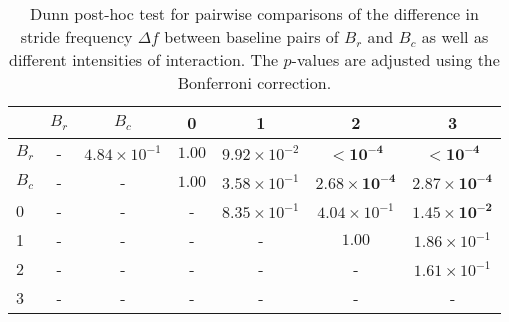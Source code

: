 \begin{table}
\centering
\caption{Dunn post-hoc test for pairwise comparisons of the difference in stride frequency $\Delta f$ between baseline pairs of $B_r$ and $B_c$ as well as different intensities of interaction. The $p$-values are adjusted using the Bonferroni correction.}
\label{tab:dunn_delta_f}
\begin{tabular}{lcccccc}
\toprule
 & $B_r$ & $B_c$ & 0 & 1 & 2 & 3 \\
\midrule
$B_r$ & - & $4.84 \times 10^{-1}$ & $1.00$ & $9.92 \times 10^{-2}$ & $\mathbf{< 10^{-4}}$ & $\mathbf{< 10^{-4}}$ \\
$B_c$ & - & - & $1.00$ & $3.58 \times 10^{-1}$ & $\mathbf{2.68 \times 10^{-4}}$ & $\mathbf{2.87 \times 10^{-4}}$ \\
0 & - & - & - & $8.35 \times 10^{-1}$ & $4.04 \times 10^{-1}$ & $\mathbf{1.45 \times 10^{-2}}$ \\
1 & - & - & - & - & $1.00$ & $1.86 \times 10^{-1}$ \\
2 & - & - & - & - & - & $1.61 \times 10^{-1}$ \\
3 & - & - & - & - & - & - \\
\bottomrule
\end{tabular}
\end{table}
